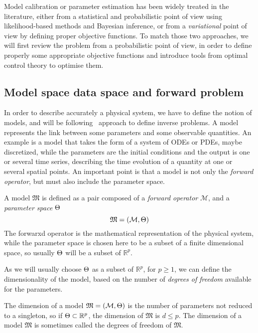 \documentclass[../../Main_ManuscritThese.tex]{subfiles}
\begin{document}
Model calibration or parameter estimation has been widely treated in
the literature, either from a statistical and probabilistic point of
view using likelihood-based methods and Bayesian inference, or from a
\emph{variational} point of view by defining proper objective
functions. To match those two approaches, we will first review the
problem from a probabilistic point of view, in order to define
properly some appropriate objective functions and introduce tools from
optimal control theory to optimise them.

 \subsection{Model space data space and forward problem}
\label{sec:model_space_data_space}
In order to describe accurately a physical system, we have to define
the notion of models, and will be
following~\cite{tarantola_inverse_2005} approach to define inverse
problems.  A model represents the link between some parameters and
some observable quantities. An example is a model that takes the form
of a system of ODEs or PDEs, maybe discretized, while the parameters
are the initial conditions and the output is one or several time
series, describing the time evolution of a quantity at one or several
spatial points. An important point is that a model is not only the
\emph{forward operator}, but must also include the parameter space.


 \begin{definition}[Model]
   \label{def:model}
  A model $\mathfrak{M}$ is defined as a pair composed of a \emph{forward operator} $\mathcal{M}$, and a \emph{parameter space} $\Theta$
  \begin{equation}
    \mathfrak{M} = (\mathcal{M}, \Theta)
  \end{equation}
  The forwarxd operator is the mathematical representation of the
  physical system, while the parameter space is chosen here to be a
  subset of a finite dimensional space, so usually $\Theta$ will be a
  subset of $\mathbb{R}^p$.
\end{definition}
As we will usually choose $\Theta$ as a subset of $\mathbb{R}^p$, for
$p\geq 1$, we can define the dimensionality of the model, based on the
number of \emph{degrees of freedom} available for the parameters.


\begin{remark}
  \label{rmk:model_dimension}
  The dimension of a model $\mathfrak{M}=(\mathcal{M},\Theta)$ is the number of parameters not reduced to a singleton, so if $\Theta \subset \mathbb{R}^p$, the dimension of $\mathfrak{M}$ is $d \leq p$. The dimension of a model $\mathfrak{M}$ is sometimes called the degrees of freedom of $\mathfrak{M}$.
  \end{remark}
\end{document}
